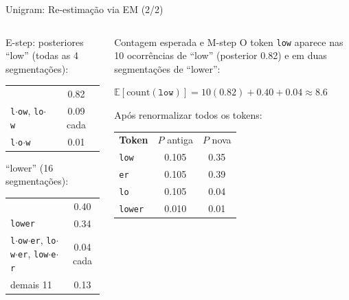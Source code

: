 \documentclass[aspectratio=169,xcolor=dvipsnames]{beamer}
\newcommand{\tok}[1]{\fcolorbox{pucrsblue}{lightblue}{\strut\textcolor{black}{\texttt{#1}}}}
\begin{document}
\begin{frame}{Unigram: Re-estimação via EM (2/2)}

\begin{columns}[T]
\begin{block}{E-step: posteriores}
{\small ``low'' (todas as 4 segmentações):}

\vspace{2pt}
{\small
\begin{tabular}{lc}
\tok{low} & 0.82 \\
\texttt{l}$\cdot$\texttt{ow}, \texttt{lo}$\cdot$\texttt{w} & 0.09 cada \\
\texttt{l}$\cdot$\texttt{o}$\cdot$\texttt{w} & 0.01 \\
\end{tabular}
}

\vspace{6pt}
{\small ``lower'' (16 segmentações):}

\vspace{2pt}
{\small
\begin{tabular}{lc}
\tok{low}~\tok{er} & 0.40 \\
\texttt{lower} & 0.34 \\
\texttt{l}$\cdot$\texttt{ow}$\cdot$\texttt{er}, \texttt{lo}$\cdot$\texttt{w}$\cdot$\texttt{er}, \texttt{low}$\cdot$\texttt{e}$\cdot$\texttt{r} & 0.04 cada \\
demais 11 & 0.13 \\
\end{tabular}
}
\end{block}

\begin{block}{Contagem esperada e M-step}
{\small O token \texttt{low} aparece nas 10 ocorrências de ``low'' (posterior 0.82) e em duas segmentações de ``lower'':}

\vspace{2pt}
{\centering\small $\mathbb{E}[\text{count}(\texttt{low})] = 10 (0.82) + 0.40 + 0.04 \approx 8.6$\par}
\vspace{2pt}

{\small Após renormalizar todos os tokens:}

\vspace{2pt}
{\small
\begin{tabular}{lcc}
\textbf{Token} & $P$ antiga & $P$ nova \\
\texttt{low}   & 0.105 & 0.35 \\
\texttt{er}    & 0.105 & 0.39 \\
\texttt{lo}    & 0.105 & 0.04 \\
\texttt{lower} & 0.010 & 0.01 \\
\end{tabular}
}
\end{block}
\end{columns}


\end{frame}
\end{document}
